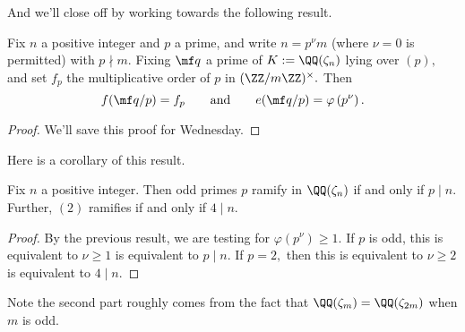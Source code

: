 And we'll close off by working towards the following result.
\begin{proposition}
	Fix $n$ a positive integer and $p$ a prime, and write $n=p^\nu m$ (where $\nu=0$ is permitted) with $p\nmid m.$ Fixing $\mf q$ a prime of $K:=\QQ(\zeta_n)$ lying over $(p),$ and set $f_p$ the multiplicative order of $p$ in $(\ZZ/m\ZZ)^\times.$ Then
	\[f(\mf q/p)=f_p\qquad\text{and}\qquad e(\mf q/p)=\varphi\left(p^\nu\right).\]
\end{proposition}
\begin{proof}
	We'll save this proof for Wednesday.
\end{proof}
Here is a corollary of this result.
\begin{corollary}
	Fix $n$ a positive integer. Then odd primes $p$ ramify in $\QQ(\zeta_n)$ if and only if $p\mid n.$ Further, $(2)$ ramifies if and only if $4\mid n.$
\end{corollary}
\begin{proof}
	By the previous result, we are testing for $\varphi\left(p^\nu\right)\ge1.$ If $p$ is odd, this is equivalent to $\nu\ge1$ is equivalent to $p\mid n.$ If $p=2,$ then this is equivalent to $\nu\ge2$ is equivalent to $4\mid n.$
\end{proof}
Note the second part roughly comes from the fact that $\QQ(\zeta_m)=\QQ(\zeta_{2m})$ when $m$ is odd.